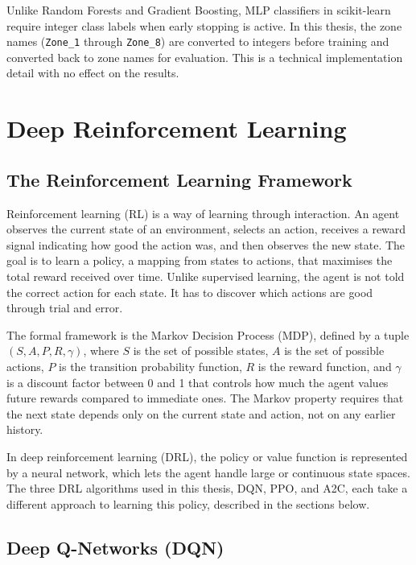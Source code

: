 Unlike Random Forests and Gradient Boosting, MLP classifiers in scikit-learn require
integer class labels when early stopping is active. In this thesis, the zone names
(\texttt{Zone\_1} through \texttt{Zone\_8}) are converted to integers before training and
converted back to zone names for evaluation. This is a technical implementation detail
with no effect on the results.

\section{Deep Reinforcement Learning}
\label{sec:bg:drl}

\subsection{The Reinforcement Learning Framework}
\label{subsec:bg:drl:framework}

Reinforcement learning (RL) is a way of learning through interaction. An agent observes
the current state of an environment, selects an action, receives a reward signal
indicating how good the action was, and then observes the new state. The goal is to learn
a policy, a mapping from states to actions, that maximises the total reward received over
time. Unlike supervised learning, the agent is not told the correct action for each
state. It has to discover which actions are good through trial and error.

The formal framework is the Markov Decision Process (MDP), defined by a tuple
$(S, A, P, R, \gamma)$, where $S$ is the set of possible states, $A$ is the set of
possible actions, $P$ is the transition probability function, $R$ is the reward function,
and $\gamma$ is a discount factor between 0 and 1 that controls how much the agent values
future rewards compared to immediate ones. The Markov property requires that the next
state depends only on the current state and action, not on any earlier history.

In deep reinforcement learning (DRL), the policy or value function is represented by a
neural network, which lets the agent handle large or continuous state spaces. The three
DRL algorithms used in this thesis, DQN, PPO, and A2C, each take a different approach to
learning this policy, described in the sections below.

\subsection{Deep Q-Networks (DQN)}
\label{subsec:bg:dqn}

